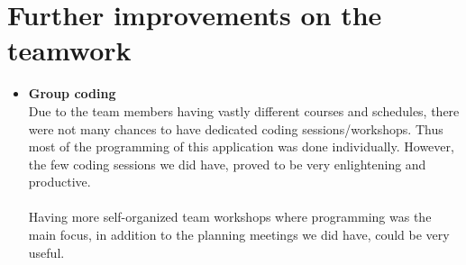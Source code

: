 \section{Further improvements on the teamwork}
\vspace{-5mm}
\begin{itemize}
 \item \textbf{Group coding} \\ Due to the team members having vastly different courses and schedules, there were not many chances to have dedicated coding sessions/workshops. Thus most of the programming of this application was done individually. However, the few coding sessions we did have, proved to be very enlightening and productive. \\\\Having more self-organized team workshops where programming was the main focus, in addition to the planning meetings we did have, could be very useful.\\
 
\end{itemize}